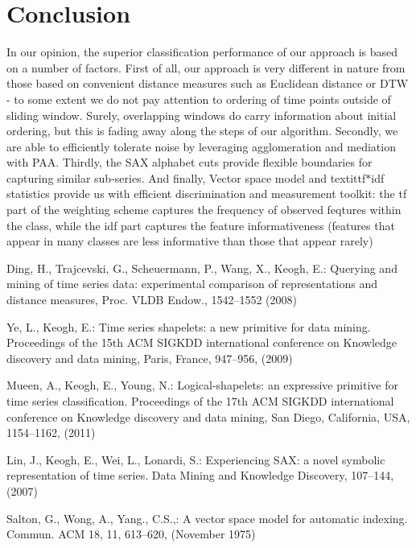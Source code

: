 \documentclass{llncs}
\begin{document}
\section{Conclusion}
In our opinion, the superior classification performance of our approach is based on 
a number of factors. 
First of all, our approach is very different in nature from those 
based on convenient distance measures such as Euclidean distance or DTW - to some 
extent we do not pay attention to ordering of time points outside of sliding window. 
Surely, overlapping windows do carry information about initial ordering, but this 
is fading away along the steps of our algorithm.
Secondly, we are able to efficiently tolerate noise by leveraging agglomeration 
and mediation with PAA. 
Thirdly, the SAX alphabet cuts provide flexible boundaries for capturing similar 
sub-series. 
And finally, Vector space model and textit{tf$\ast$idf} statistics provide us 
with efficient discrimination and measurement toolkit: the tf part of the weighting scheme
captures the frequency of observed feqtures within the class, while the idf part 
captures the feature informativeness (features that appear in many classes 
are less informative than those that appear rarely)

%
%
\begin{thebibliography}{5}
%

Ding, H., Trajcevski, G., Scheuermann, P., Wang, X., Keogh, E.:
Querying and mining of time series data: experimental comparison of representations and distance measures,
Proc. VLDB Endow., 1542--1552 (2008)

Ye, L., Keogh, E.:
Time series shapelets: a new primitive for data mining.
Proceedings of the 15th ACM SIGKDD international conference on Knowledge discovery and data mining,
Paris, France, 947--956, (2009)

Mueen, A., Keogh, E., Young, N.:
Logical-shapelets: an expressive primitive for time series classification.
Proceedings of the 17th ACM SIGKDD international conference on Knowledge discovery and data mining,
San Diego, California, USA, 1154--1162, (2011)

Lin, J., Keogh, E., Wei, L., Lonardi, S.:
Experiencing SAX: a novel symbolic representation of time series.
Data Mining and Knowledge Discovery, 107--144, (2007)

Salton, G., Wong, A., Yang., C.S.,:
A vector space model for automatic indexing. 
Commun. ACM 18, 11, 613--620, (November 1975)

\end{thebibliography}

%
\end{document}
